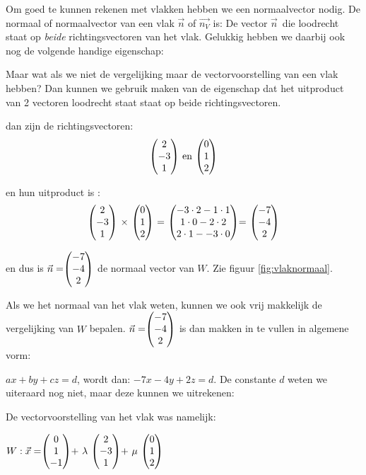 Om goed te kunnen rekenen met vlakken hebben we een normaalvector nodig.
\label{vlaknormaal}
{De normaal of normaalvector van een vlak $\vec{n}$ of  $\overrightarrow{n_{V}}$ is: De vector $ \vec{n} $\ die loodrecht staat op \textit{beide} richtingsvectoren van het vlak. Gelukkig hebben we daarbij ook nog de volgende handige eigenschap:}



\newpage
Maar wat als we niet de vergelijking maar de vectorvoorstelling van een vlak hebben? Dan kunnen we gebruik maken van de eigenschap dat  het uitproduct van 2 vectoren loodrecht staat staat op beide richtingsvectoren. 

dan zijn de richtingsvectoren: \[\vecdrie{2}{-3}{1} \text{ en } \vecdrie{0}{1}{2} \]
 
en hun uitproduct is : \[
 \vecdrie{2}{-3}{1} \ \times \  \vecdrie{0}{1}{2}  \ = \ \vecdrie{-3\cdot2-1\cdot1}{1\cdot0-2\cdot2}{2\cdot1--3\cdot0} = \ \vecdrie{-7}{-4}{2} 
\]
 
en dus is $ \vec{n} = \vecdrie{-7}{-4}{2}  $ de normaal vector van $ W $.  Zie figuur  \ref{fig:vlaknormaal}.


Als we het normaal van het vlak weten, kunnen we ook vrij makkelijk de vergelijking van $ W $ bepalen. $\vec{n} = \vecdrie{-7}{-4}{2} $ is dan makken in te vullen in algemene vorm: 

$ax + by + cz = d$, wordt dan: $ -7x-4y+2z = d $. De constante $d$ weten we uiteraard nog niet, maar deze kunnen we uitrekenen: 

De vectorvoorstelling van het vlak was namelijk: 

$ W: \vec{x}  = \vecdrie{0}{1}{-1}    + \  \lambda \  \vecdrie{2}{-3}{1} + \ \mu \ \vecdrie{0}{1}{2} $ 

